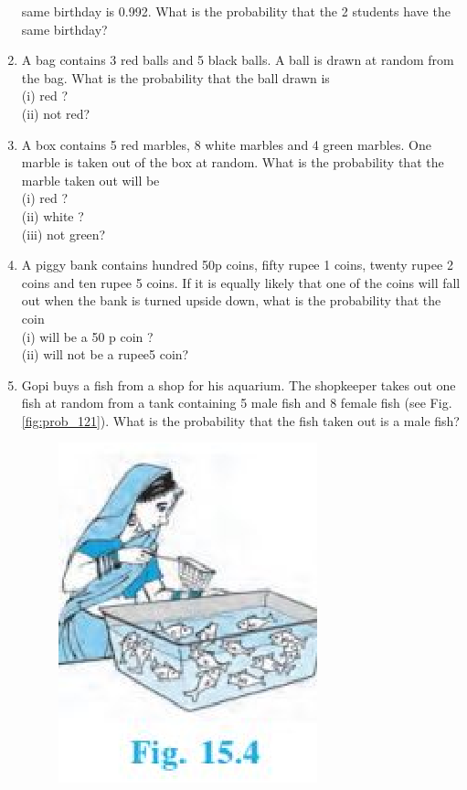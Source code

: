 \begin{enumerate}[label=\arabic*.,ref=\thesubsection.\theenumi]
same birthday is 0.992. What is the probability that the 2 students have the same
birthday?
\item A bag contains 3 red balls and 5 black balls. A ball is drawn at random from the bag.
What is the probability that the ball drawn is\\ 
(i) red ? \\
(ii) not red?
\item A box contains 5 red marbles, 8 white marbles and 4 green marbles. One marble is taken
out of the box at random. What is the probability that the marble taken out will be\\
(i) red ?\\
(ii) white ? \\
(iii) not green?
\item A piggy bank contains hundred 50p coins, fifty rupee 1 coins, twenty rupee 2 coins and ten rupee 5 coins. If it is equally likely that one of the coins will fall out when the bank is turned upside down, what is the probability that the coin \\
(i) will be a 50 p coin ?\\
(ii) will not be a rupee5 coin?
\item Gopi buys a fish from a shop for his aquarium. The
shopkeeper takes out one fish at random from a
tank containing 5 male fish and 8 female fish (see
Fig. \ref{fig:prob_121}). What is the probability that the fish taken
out is a male fish?
\begin{figure}[!ht]
\centering
\includegraphics[width=\columnwidth]{./prob/figs/woman.eps}

\end{figure}
\end{enumerate}
